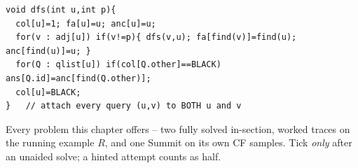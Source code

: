 \begin{lstlisting}[caption={Drill 5 -- Tarjan offline LCA core (from lst:c21-tarjan)}]
void dfs(int u,int p){
  col[u]=1; fa[u]=u; anc[u]=u;
  for(v : adj[u]) if(v!=p){ dfs(v,u); fa[find(v)]=find(u); anc[find(u)]=u; }
  for(Q : qlist[u]) if(col[Q.other]==BLACK) ans[Q.id]=anc[find(Q.other)];
  col[u]=BLACK;
}   // attach every query (u,v) to BOTH u and v
\end{lstlisting}


Every problem this chapter offers -- two fully solved in-section, worked traces on the
running example \(R\), and one Summit on its own CF samples. Tick \emph{only} after an
unaided solve; a hinted attempt counts as half.

